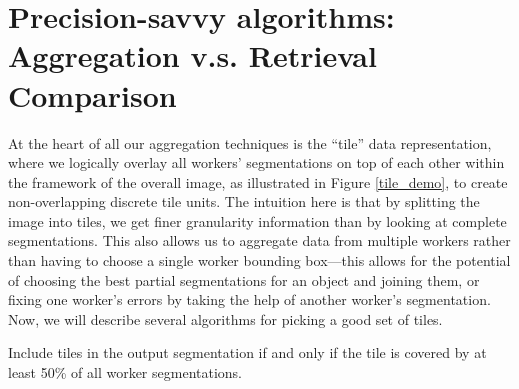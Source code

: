 \section{Precision-savvy algorithms: Aggregation v.s. Retrieval Comparison}

At the heart of all our aggregation techniques is the ``tile'' data representation, where we logically overlay all workers' segmentations on top of each other within the framework of the overall image, as illustrated in Figure \ref{tile_demo}, to create non-overlapping discrete tile units. The intuition here is that by splitting the image into tiles, we get finer granularity information than by looking at complete segmentations. This also allows us to aggregate data from multiple workers rather than having to choose a single worker bounding box---this allows for the potential of choosing the best partial segmentations for an object and joining them, or fixing one worker's errors by taking the help of another worker's segmentation. Now, we will describe several algorithms for picking a good set of tiles.

 Include tiles in the output segmentation if and only if the tile is covered by at least 50\% of all worker segmentations.

